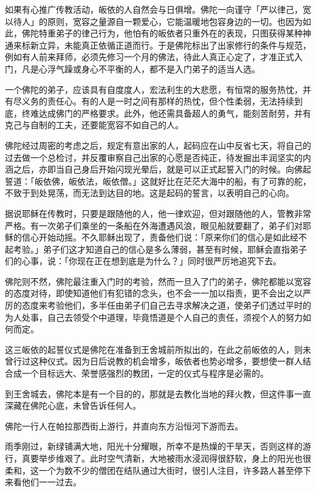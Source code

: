\documentclass[12pt,twoside,openany]{book}
\begin{document}
如果有心推广传教活动，皈依的人自然会与日俱增。佛陀一向谨守「严以律己，宽以待人」的原则，宽容之量源自一颗爱心，它能温暖地包容身边的一切。也因为如此，佛陀特重弟子的律己行为，他怕有的皈依者只重外在的表现，只图获得某种神通来标新立异，未能真正依循正道而行。于是佛陀标出了出家修行的条件与规范，例如有人前来拜师，必须先修习一个月的佛法，待此人真正心定了，才准正式入门，凡是心浮气躁或身心不平衡的人，都不是入门弟子的适当人选。

一个佛陀的弟子，应该具有自度度人，宏法利生的大悲愿，有恒常的服务热忱，并有尽义务的责任心。有的人是一时之间有那样的热忱，但个性柔弱，无法持续到底，终难达成佛门的严格要求。此外，他还需具备超人的勇气，能刻苦耐劳，并有克己与自制的工夫，还要能宽容不如自己的人。

佛陀经过周密的考虑之后，规定有意出家的人，起码应在山中反省七天，将自己的过去做一个总检讨，并反覆审察自己出家的心愿是否纯正，待发掘出丰润坚实的内涵之后，亦即当自己身后开始闪现光晕后，就是可以正式起誓入门的时候。向佛起誓道：「皈依佛，皈依法，皈依僧。」这就好比在茫茫大海中的船，有了可靠的舵，不致于到处晃荡，而无法到达目的地。这是起码的誓言，以表明自己的心向。

据说耶稣在传教时，只要是跟随他的人，他一律欢迎，但对跟随他的人，管教非常严格。有一次弟子们乘坐的一条船在外海遭遇风浪，眼见船就要翻了，弟子们对耶稣的信心开始动摇。不久耶稣出现了，责备他们说：「原来你们的信心是如此经不起考验。」弟子们这才知道自己的信心是多么薄弱，甚至有时候，耶稣会直指弟子们的心事，说：「你现在正在想到底是为什么？」同时很严厉地追究下去。

佛陀则不然，佛陀最注重入门时的考验，然而一旦入了门的弟子，佛陀都能以宽容的态度对待，即使知道他们有犯错的念头，也不会一一加以指责，更不会出之以严厉的态度来考验他们，多半任由弟子们自己去寻求解决之道，使弟子们透过平时的为人处事，自己去领受个中道理，毕竟悟道是个人自己的责任，须视个人的努力如何而定。

这三皈依的起誓仪式是佛陀在准备到王舍城前所拟出的，在此之前皈依的人，则未曾行过这种仪式。因为日后说教的机会增多，皈依者也势必增多，要想使一群人结合成一个目标远大、荣誉感强烈的教团，一定的仪式与程序是必需的。

到王舍城去，佛陀本是有一个目的的，那就是去教化当地的拜火教，但这件事一直深藏在佛陀心底，未曾告诉任何人。

佛陀一行人在帕拉那西街上游行，并直向东方沿恒河下游而去。

雨季刚过，新绿铺满大地，阳光十分耀眼，所幸不是热燥的干旱天，否则这样的游行，真要举步维艰了。此时空气清新，大地被雨水浸润得很舒软，身上的阳光也很柔和，这一个为数不少的僧团在结队通过大街时，很引人注目，许多路人甚至停下来看他们一一过去。
\end{document}
